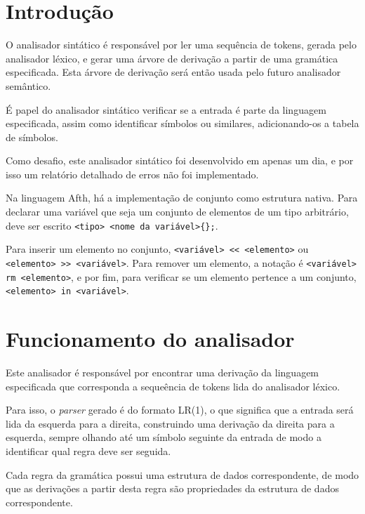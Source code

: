 \documentclass[
	article,			%
	11pt,				%
	oneside,			%
	a4paper,			%
	english,			%
	brazil,				%
	sumario=tradicional
	]{abntex2}
\begin{document}
\textual

\section{Introdução}

O analisador sintático é responsável por ler uma sequência de tokens, gerada pelo analisador léxico, e gerar uma árvore de derivação a partir de uma gramática especificada. Esta árvore de derivação será então usada pelo futuro analisador semântico.

É papel do analisador sintático verificar se a entrada é parte da linguagem especificada, assim como identificar símbolos ou similares, adicionando-os a tabela de símbolos.

Como desafio, este analisador sintático foi desenvolvido em apenas um dia, e por isso um relatório detalhado de erros não foi implementado. 

Na linguagem Afth, há a implementação de conjunto como estrutura nativa. Para declarar uma variável que seja um conjunto de elementos de um tipo arbitrário, deve ser escrito \texttt{<tipo> <nome da variável>\{\};}.

Para inserir um elemento no conjunto, \texttt{<variável> << <elemento>} ou \texttt{<elemento> >> <variável>}. Para remover um elemento, a notação é \texttt{<variável> rm <elemento>}, e por fim, para verificar se um elemento pertence a um conjunto, \texttt{<elemento> in <variável>}.

\section{Funcionamento do analisador}

Este analisador é responsável por encontrar uma derivação da linguagem especificada que corresponda a sequeência de tokens lida do analisador léxico.

Para isso, o \textit{parser} gerado é do formato LR(1), o que significa que a entrada será lida da esquerda para a direita, construindo uma derivação da direita para a esquerda, sempre olhando até um símbolo seguinte da entrada de modo a identificar qual regra deve ser seguida.

Cada regra da gramática possui uma estrutura de dados correspondente, de modo que as derivações a partir desta regra são propriedades da estrutura de dados correspondente.
\end{document}
